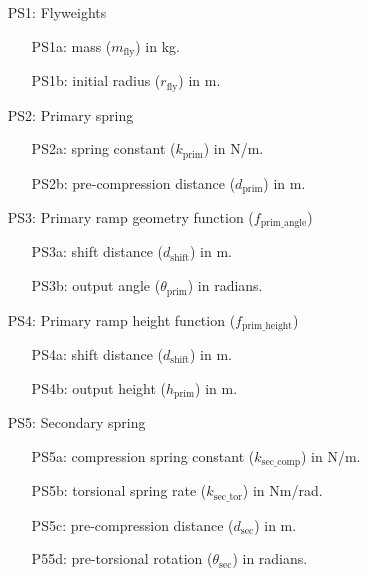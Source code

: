 \documentclass[12pt]{article}
\begin{document}
\begin{itemize}

\item[PS1:] Flyweights
\begin{itemize}
  \item [PS1a:] mass ($m_{\text{fly}}$) in kg.
  \item [PS1b:] initial radius ($r_{\text{fly}}$) in m.
\end{itemize}

\item[PS2:] Primary spring

\begin{itemize}
  \item [PS2a:] spring constant ($k_{\text{prim}}$) in N/m.
  \item [PS2b:] pre-compression distance ($d_{\text{prim}}$) in m.
\end{itemize}

\item[PS3:] Primary ramp geometry function ($f_{\text{prim\_angle}}$)

\begin{itemize}
  \item [PS3a:] shift distance ($d_{\text{shift}}$) in m.
  \item [PS3b:] output angle ($\theta_{\text{prim}}$) in radians.
\end{itemize}

\item[PS4:] Primary ramp height function ($f_{\text{prim\_height}}$)

\begin{itemize}
  \item [PS4a:] shift distance ($d_{\text{shift}}$) in m.
  \item [PS4b:] output height ($h_{\text{prim}}$) in m.
\end{itemize}

\item[PS5:] Secondary spring

\begin{itemize}
  \item [PS5a:] compression spring constant ($k_{\text{sec\_comp}}$) in N/m.
  \item [PS5b:] torsional spring rate ($k_{\text{sec\_tor}}$) in Nm/rad.
  \item [PS5c:] pre-compression distance ($d_{\text{sec}}$) in m.
  \item [P55d:] pre-torsional rotation ($\theta_{\text{sec}}$) in radians.
\end{itemize}


\end{itemize}
\end{document}
